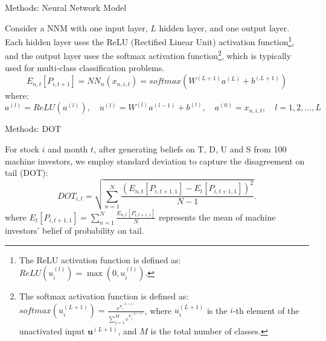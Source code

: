 \documentclass[11pt, aspectratio=169]{beamer}
\newenvironment{wideitemize}{\itemize\addtolength{\itemsep}{10pt}}{\enditemize}
\begin{document}
\begin{frame}{Methods: Neural Network Model}
    \bigskip
    \begin{wideitemize}
    \item Consider a NNM with one input layer, $L$ hidden layer, and one output layer. Each hidden layer uses the \alert{ReLU} (Rectified Linear Unit) activation function\footnote{The ReLU activation function is defined as: $ReLU(u^{(l)}_i)=\max(0,u^{(l)}_i)$.}, and the output layer uses the \alert{softmax} activation function\footnote{The softmax activation function is defined as: $softmax(u^{(L+1)}_i)=\frac{e^{u^{(L+1)}_i}}{\sum_{j=1}^Me^{u^{(L+1)}_j}}$, where $u^{(L+1)}_i$ is the $i$-th element of the unactivated input $\mathbf{u}^{(L+1)}$, and $M$ is the total number of classes.}, which is typically used for multi-class classification problems.
    \begin{equation*}
E_{n,t}[P_{i,t+1}]=NN_{n}\left(x_{n,i,t}\right)=softmax\left(W^{(L+1)}a^{(L)}+b^{(L+1)}\right) \label{nn}
    \end{equation*}
    where:$$a^{(l)}=ReLU(u^{(l)}),\quad u^{(l)}=W^{(l)}a^{(l-1)}+b^{(l)},\quad a^{(0)}={x_{n,i,t}},\quad l=1,2,\ldots,L$$
    \end{wideitemize}
\end{frame}

\begin{frame}{Methods: DOT}
    \bigskip
    \begin{wideitemize}
    \item For stock $i$ and month $t$, after generating beliefs on T, D, U and S from 100 machine investors, we employ standard deviation to capture the \alert{disagreement on tail (DOT)}:
    \begin{equation*}
        DOT_{i,t}=\sqrt{\sum_{n=1}^{N}\frac{\left(E_{n,t}[P_{i,t+1,1}]-E_t[P_{i,t+1,1}]\right)^{2}}{N-1}}.
    \end{equation*}
    where $E_t[P_{i,t+1,1}] = \sum_{n=1}^{N}\frac{E_{n,t}[P_{i,t+1,1}]}{N}$ represents the mean of machine investors' belief of probability on tail.
    \end{wideitemize}
\end{frame}
\end{document}
